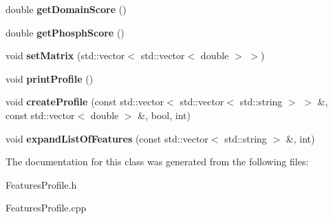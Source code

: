 \begin{DoxyCompactItemize}
\item 
\hypertarget{class_features_profile_ae08af64041bfe6a5241f287b5f407851}{double {\bfseries get\+Domain\+Score} ()}\label{class_features_profile_ae08af64041bfe6a5241f287b5f407851}

\item 
\hypertarget{class_features_profile_add763538f6bd6b7f710b59e353bf6cb1}{double {\bfseries get\+Phosph\+Score} ()}\label{class_features_profile_add763538f6bd6b7f710b59e353bf6cb1}

\item 
\hypertarget{class_features_profile_af08b671cf1c3fb3e9360d76626831ee0}{void {\bfseries set\+Matrix} (std\+::vector$<$ std\+::vector$<$ double $>$ $>$)}\label{class_features_profile_af08b671cf1c3fb3e9360d76626831ee0}

\item 
\hypertarget{class_features_profile_a7f5f9814183d184f89b260d3e7648f10}{void {\bfseries print\+Profile} ()}\label{class_features_profile_a7f5f9814183d184f89b260d3e7648f10}

\item 
\hypertarget{class_features_profile_a2605179aebecc7965b2047c2ac727423}{void {\bfseries create\+Profile} (const std\+::vector$<$ std\+::vector$<$ std\+::string $>$ $>$ \&, const std\+::vector$<$ double $>$ \&, bool, int)}\label{class_features_profile_a2605179aebecc7965b2047c2ac727423}

\item 
\hypertarget{class_features_profile_ad76e1dbcdd9d8e6cdd0590383b4384ce}{void {\bfseries expand\+List\+Of\+Features} (const std\+::vector$<$ std\+::string $>$ \&, int)}\label{class_features_profile_ad76e1dbcdd9d8e6cdd0590383b4384ce}

\end{DoxyCompactItemize}


The documentation for this class was generated from the following files\+:\begin{DoxyCompactItemize}
\item 
Features\+Profile.\+h\item 
Features\+Profile.\+cpp\end{DoxyCompactItemize}
